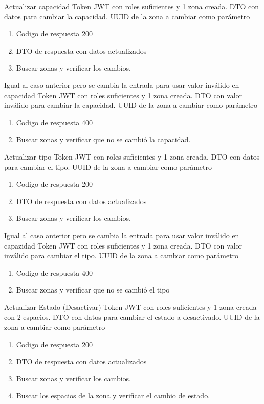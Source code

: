 {Actualizar capacidad}
{Token JWT con roles suficientes y 1 zona creada.}
{DTO con datos para cambiar la capacidad. UUID de la zona a cambiar como parámetro}
{\begin{enumerate} [leftmargin=*, nosep]
    \item Codigo de respuesta 200
    \item DTO de respuesta con datos actualizados
    \item Buscar zonas y verificar los cambios.
\end{enumerate}}

{Igual al caso anterior pero se cambia la entrada para usar valor inválido en capacidad}
{Token JWT con roles suficientes y 1 zona creada.}
{DTO con valor inválido para cambiar la capacidad. UUID de la zona a cambiar como parámetro}
{\begin{enumerate} [leftmargin=*, nosep]
    \item Codigo de respuesta 400
    \item Buscar zonas y verificar que no se cambió la capacidad.
\end{enumerate}}

{Actualizar tipo}
{Token JWT con roles suficientes y 1 zona creada.}
{DTO con datos para cambiar el tipo. UUID de la zona a cambiar como parámetro}
{\begin{enumerate} [leftmargin=*, nosep]
    \item Codigo de respuesta 200
    \item DTO de respuesta con datos actualizados
    \item Buscar zonas y verificar los cambios.
\end{enumerate}}

{Igual al caso anterior pero se cambia la entrada para usar valor inválido en capazidad}
{Token JWT con roles suficientes y 1 zona creada.}
{DTO con valor inválido para cambiar el tipo. UUID de la zona a cambiar como parámetro}
{\begin{enumerate} [leftmargin=*, nosep]
    \item Codigo de respuesta 400
    \item Buscar zonas y verificar que no se cambió el tipo
\end{enumerate}}

{Actualizar Estado (Desactivar)}
{Token JWT con roles suficientes y 1 zona creada con 2 espacios.}
{DTO con datos para cambiar el estado a desactivado. UUID de la zona a cambiar como parámetro}
{\begin{enumerate} [leftmargin=*, nosep]
    \item Codigo de respuesta 200
    \item DTO de respuesta con datos actualizados
    \item Buscar zonas y verificar los cambios.
    \item Buscar los espacios de la zona y verificar el cambio de estado.
\end{enumerate}}

